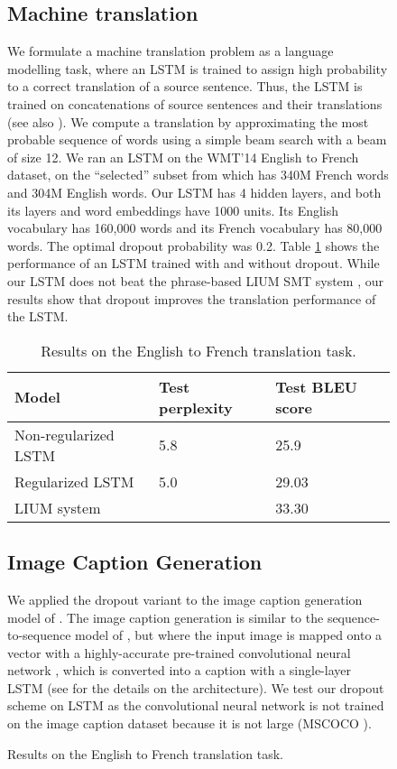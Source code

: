 \documentclass{article}
\begin{document}
\begin{figure}
{\subsection{Machine translation}
\label{sec:trans}

We formulate a machine translation problem as a language modelling task, where
an LSTM is trained to assign high probability to a correct
translation of a source sentence.  Thus, the LSTM is trained on
concatenations of source sentences and their translations 
\cite{sutskever2014sequence} (see also \cite{cho2014learning}). We compute a translation by 
approximating the most probable sequence of words
using a simple beam search with a beam of size 12.  We ran an
LSTM on the WMT'14 English to French dataset, on the
``selected'' subset from \citet{wmt_joint} which has 340M French words
and 304M English words.  Our LSTM has 4 hidden layers, and both its
layers and word embeddings have 1000 units.  Its 
English vocabulary has 160,000 words and its French vocabulary has
80,000 words.  The optimal dropout probability was 0.2.
Table \ref{tab:mt} shows the performance of an LSTM trained with and without dropout.
While our LSTM does not beat the phrase-based LIUM SMT system
\cite{lium}, our results show that dropout improves the
translation performance of the LSTM.

\begin{table}[t]
  \small
  \centering
  \renewcommand{\arraystretch}{1.15}
  \begin{tabular}{lll}
    \hline
     Model & Test perplexity & Test BLEU score \\
    \hline
    Non-regularized LSTM & 5.8 & 25.9 \\
    Regularized LSTM & 5.0 &  29.03 \\
    \hline
    LIUM system  &  &  33.30 \\
    \hline
  \end{tabular}
  \caption{Results on the English to French translation task. }
  \label{tab:mt}
\end{table}

\subsection{Image Caption Generation}
\label{sec:caption}

We applied the dropout variant 
to the image caption generation model of \cite{vinyals2014show}.  The 
image caption generation is similar to the sequence-to-sequence model
of \cite{sutskever2014sequence}, but where the input image is mapped
onto a vector with a highly-accurate pre-trained convolutional
neural network \citep{szegedy2014going}, which is converted
into a caption with a single-layer LSTM (see \citet{vinyals2014show}
for the details on the architecture).  We test our dropout scheme on  
LSTM as the convolutional neural network is not trained on the image caption
dataset because it is not large (MSCOCO \citep{lin2014microsoft}). 

}
\end{figure}
\end{document}
